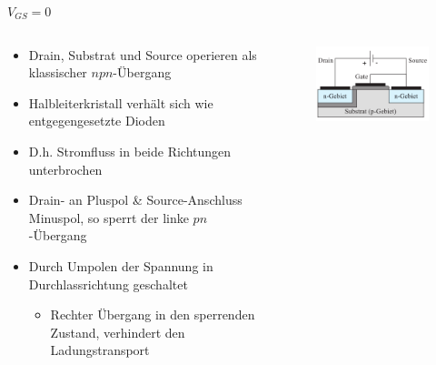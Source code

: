 \documentclass[12pt%
,aspectratio=169%
]{beamer}
\begin{document}
\begin{frame}{$V_{GS} = 0$}
\begin{columns}[T] %
\begin{column}{.62\textwidth}
	\begin{itemize}
		\item Drain, Substrat und Source operieren als klassischer $npn$-Übergang
		\item Halbleiterkristall verhält sich wie entgegengesetzte Dioden
		\item D.h. Stromfluss in beide Richtungen unterbrochen
		\item Drain- an Pluspol \& Source-Anschluss Minuspol, so sperrt der linke $pn$-Übergang
		\item Durch Umpolen der Spannung in Durchlassrichtung geschaltet
		\begin{itemize}
			\item Rechter Übergang in den sperrenden Zustand, verhindert den Ladungstransport
		\end{itemize}
	\end{itemize}
\end{column}%
\hfill%
\begin{column}{.38\textwidth}
\begin{figure}
\center
\includegraphics[scale=0.5]{pictures/fall1}\\
\end{figure}
\end{column}%
\end{columns}
\end{frame}
\end{document}
